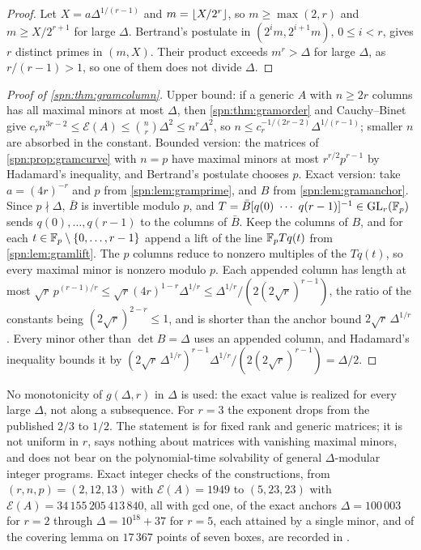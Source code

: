 \begin{proof}
Let $X=a\Delta^{1/(r-1)}$ and $m=\lfloor X/2^r\rfloor$, so $m\ge\max(2,r)$ and $m\ge X/2^{r+1}$ for large $\Delta$. Bertrand's
postulate in $(2^im,2^{i+1}m)$, $0\le i<r$, gives $r$ distinct primes in $(m,X)$. Their product exceeds
$m^r>\Delta$ for large $\Delta$, as $r/(r-1)>1$, so one of them does not divide $\Delta$.
\end{proof}

\begin{proof}[Proof of \cref{spn:thm:gramcolumn}]
Upper bound: if a generic $A$ with $n\ge2r$ columns has all maximal minors at most $\Delta$, then
\cref{spn:thm:gramorder} and Cauchy--Binet give $c_rn^{3r-2}\le\mathcal E(A)\le\binom nr\Delta^2\le n^r\Delta^2$, so
$n\le c_r^{-1/(2r-2)}\Delta^{1/(r-1)}$; smaller $n$ are absorbed in the constant. Bounded version: the matrices of
\cref{spn:prop:gramcurve} with $n=p$ have maximal minors at most $r^{r/2}p^{r-1}$ by Hadamard's inequality, and
Bertrand's postulate chooses $p$. Exact version: take $a=(4r)^{-r}$ and $p$ from \cref{spn:lem:gramprime}, and $B$
from \cref{spn:lem:gramanchor}. Since $p\nmid\Delta$, $\bar B$ is invertible modulo $p$, and
$T=\bar B[q(0)\ \cdots\ q(r-1)]^{-1}\in\GL_r(\F_p)$ sends $q(0),\dots,q(r-1)$ to the columns of $\bar B$. Keep the
columns of $B$, and for each $t\in\mathbb{F}_p\setminus\{0,\dots,r-1\}$ append a lift of the line $\mathbb{F}_pTq(t)$ from
\cref{spn:lem:gramlift}. The $p$ columns reduce to nonzero multiples of the $Tq(t)$, so every maximal minor is
nonzero modulo $p$. Each appended column has length at most
$\sqrt r\,p^{(r-1)/r}\le\sqrt r(4r)^{1-r}\Delta^{1/r}\le\Delta^{1/r}/(2(2\sqrt r)^{r-1})$, the ratio of the
constants being $(2\sqrt r)^{2-r}\le1$, and is shorter than the anchor bound $2\sqrt r\,\Delta^{1/r}$. Every minor
other than $\det B=\Delta$ uses an appended column, and Hadamard's inequality bounds it by
$(2\sqrt r\,\Delta^{1/r})^{r-1}\Delta^{1/r}/(2(2\sqrt r)^{r-1})=\Delta/2$.
\end{proof}

No monotonicity of $g(\Delta,r)$ in $\Delta$ is used: the exact value is realized for every large $\Delta$, not
along a subsequence. For $r=3$ the exponent drops from the published $2/3$ to $1/2$. The statement is for fixed
rank and generic matrices; it is not uniform in $r$, says nothing about matrices with vanishing maximal minors, and
does not bear on the polynomial-time solvability of general $\Delta$-modular integer programs. Exact integer
checks of the constructions, from $(r,n,p)=(2,12,13)$ with $\mathcal E(A)=1949$ to $(5,23,23)$ with
$\mathcal E(A)=34\,155\,205\,413\,840$, all with gcd one, of the exact anchors $\Delta=100\,003$ for $r=2$ through
$\Delta=10^{18}+37$ for $r=5$, each attained by a single minor, and of the covering lemma on $17\,367$ points of seven
boxes, are recorded in
.

